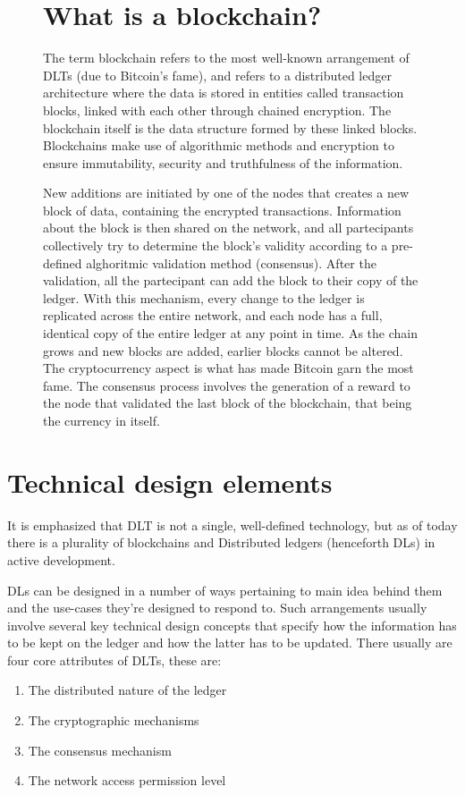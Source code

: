 \begin{figure}[h]
    \begin{tcolorbox}[colframe=boxcolor]
        \section*{What is a blockchain?}
        The term blockchain refers to the most well-known arrangement of DLTs (due to Bitcoin's fame), and refers to a distributed ledger architecture where the data is stored in entities called transaction blocks, linked with each other through chained encryption. The blockchain itself is the data structure formed by these linked blocks. Blockchains make use of algorithmic methods and encryption to ensure immutability, security and truthfulness of the information.
        
        New additions are initiated by one of the nodes that creates a new block of data, containing the encrypted transactions. Information about the block is then shared on the network, and all partecipants collectively try to determine the block's validity according to a pre-defined alghoritmic validation method (consensus). After the validation, all the partecipant can add the block to their copy of the ledger. With this mechanism, every change to the ledger is replicated across the entire network, and each node has a full, identical copy of the entire ledger at any point in time. As the chain grows and new blocks are added, earlier blocks cannot be altered. \\

        The cryptocurrency aspect is what has made Bitcoin garn the most fame. The consensus process involves the generation of a reward to the node that validated the last block of the blockchain, that being the currency in itself.
    \end{tcolorbox}
\end{figure}
\newpage

\section{Technical design elements}

It is emphasized that DLT is not a single, well-defined technology, but as of today there is a plurality of blockchains and Distributed ledgers (henceforth DLs) in active development.

DLs can be designed in a number of ways pertaining to main idea behind them and the use-cases they're designed to respond to. Such arrangements usually involve several key technical design concepts that specify how the information has to be kept on the ledger and how the latter has to be updated. 
There usually are four core attributes of DLTs, these are:
\begin{enumerate}
    \item The distributed nature of the ledger
    \item The cryptographic mechanisms
    \item The consensus mechanism
    \item The network access permission level
\end{enumerate}

